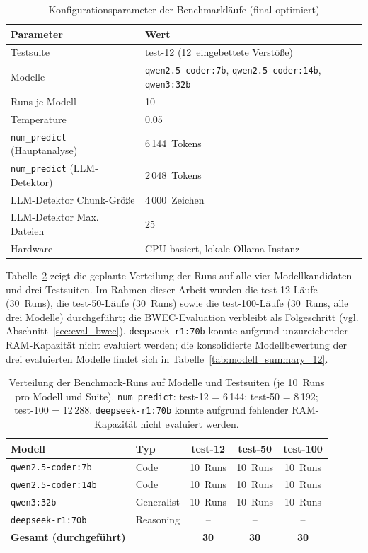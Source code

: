 \begin{table}[htbp]
\centering
\small
\renewcommand{\arraystretch}{1.15}
\begin{tabular}{@{}ll@{}}
\toprule
\textbf{Parameter} & \textbf{Wert} \\
\midrule
Testsuite & test-12 (12~eingebettete Verstöße) \\
Modelle & \texttt{qwen2.5-coder:7b}, \texttt{qwen2.5-coder:14b}, \texttt{qwen3:32b} \\
Runs je Modell & 10 \\
Temperature & 0.05 \\
\texttt{num\_predict} (Hauptanalyse) & 6\,144~Tokens \\
\texttt{num\_predict} (\ac{LLM}-Detektor) & 2\,048~Tokens \\
\ac{LLM}-Detektor Chunk-Größe & 4\,000~Zeichen \\
\ac{LLM}-Detektor Max. Dateien & 25 \\
Hardware & \ac{CPU}-basiert, lokale Ollama-Instanz \\
\bottomrule
\end{tabular}
\caption{Konfigurationsparameter der Benchmarkläufe (final optimiert)}
\label{tab:versuchsdesign_uebersicht}
\end{table}

Tabelle~\ref{tab:benchmark_runs} zeigt die geplante Verteilung der Runs auf alle vier Modellkandidaten und drei Testsuiten. Im Rahmen dieser Arbeit wurden die test-12-Läufe (30~Runs), die test-50-Läufe (30~Runs) sowie die test-100-Läufe (30~Runs, alle drei Modelle) durchgeführt; die \ac{BWEC}-Evaluation verbleibt als Folgeschritt (vgl. Abschnitt~\ref{sec:eval_bwec}). \texttt{deepseek-r1:70b} konnte aufgrund unzureichender \ac{RAM}-Kapazität nicht evaluiert werden; die konsolidierte Modellbewertung der drei evaluierten Modelle findet sich in Tabelle~\ref{tab:modell_summary_12}.

\begin{table}[htbp]
\centering
\small
\renewcommand{\arraystretch}{1.15}
\begin{tabular}{@{}llccc@{}}
\toprule
\textbf{Modell} & \textbf{Typ} & \textbf{test-12} & \textbf{test-50} & \textbf{test-100} \\
\midrule
\texttt{qwen2.5-coder:7b}  & Code & 10~Runs & 10~Runs & 10~Runs\\
\texttt{qwen2.5-coder:14b} & Code & 10~Runs & 10~Runs & 10~Runs \\
\texttt{qwen3:32b}         & Generalist & 10~Runs & 10~Runs & 10~Runs \\
\texttt{deepseek-r1:70b}   & Reasoning  & -- & -- & -- \\
\midrule
\textbf{Gesamt (durchgeführt)} & & \textbf{30} & \textbf{30} & \textbf{30} \\
\bottomrule
\end{tabular}
\caption[Durchgeführte Benchmark-Runs je Modell und Testsuite]{Verteilung der Benchmark-Runs auf Modelle und Testsuiten (je 10~Runs pro Modell und Suite). \texttt{num\_predict}: test-12 = 6\,144; test-50 = 8\,192; test-100 = 12\,288. \texttt{deepseek-r1:70b} konnte aufgrund fehlender \ac{RAM}-Kapazität nicht evaluiert werden.}
\label{tab:benchmark_runs}
\end{table}

